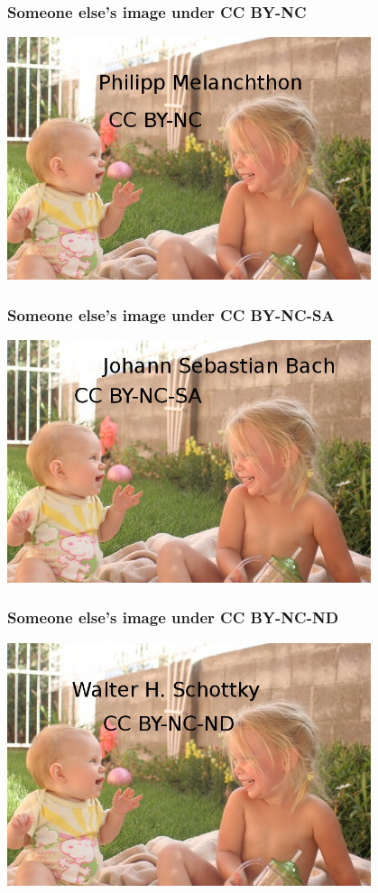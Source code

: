 \documentclass[mathserif,xcolor=dvipsnames,hyperref={bookmarks=true}]{beamer}
\begin{document}
\begin{frame}[t]
    \frametitle{Someone else's image under CC BY-NC}
    \begin{center}
        \includegraphics[width=0.8\textwidth]{../images/others/cc-by-nc.jpg}
    \end{center}
\end{frame}
\begin{frame}[t]
    \frametitle{Someone else's image under CC BY-NC-SA}
    \begin{center}
        \includegraphics[width=0.8\textwidth]{../images/others/cc-by-nc-sa.jpg}
    \end{center}
\end{frame}
\begin{frame}[t]
    \frametitle{Someone else's image under CC BY-NC-ND}
    \begin{center}
        \includegraphics[width=0.8\textwidth]{../images/others/cc-by-nc-nd.jpg}
    \end{center}
\end{frame}
\end{document}
